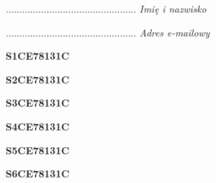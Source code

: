 \begin{turn}{90}\begin{minipage}{\linewidth} \vspace{20mm} ................................................  \textit{Imię i nazwisko}\end{minipage}\end{turn}

\begin{turn}{90}\begin{minipage}{\linewidth} \vspace{20mm} ................................................  \textit{Adres e-mailowy}\end{minipage}\end{turn}

\begin{turn}{90}\huge \begin{minipage}{\linewidth} \vspace{10mm}\textbf{S1CE78131C}\end{minipage}\end{turn}

\begin{turn}{90}\huge \begin{minipage}{\linewidth} \vspace{10mm}\textbf{S2CE78131C}\end{minipage}\end{turn}

\begin{turn}{90}\huge \begin{minipage}{\linewidth} \vspace{10mm}\textbf{S3CE78131C}\end{minipage}\end{turn}

\begin{turn}{90}\huge \begin{minipage}{\linewidth} \vspace{10mm}\textbf{S4CE78131C}\end{minipage}\end{turn}

\begin{turn}{90}\huge \begin{minipage}{\linewidth} \vspace{10mm}\textbf{S5CE78131C}\end{minipage}\end{turn}

\begin{turn}{90}\huge \begin{minipage}{\linewidth} \vspace{10mm}\textbf{S6CE78131C}\end{minipage}\end{turn}

